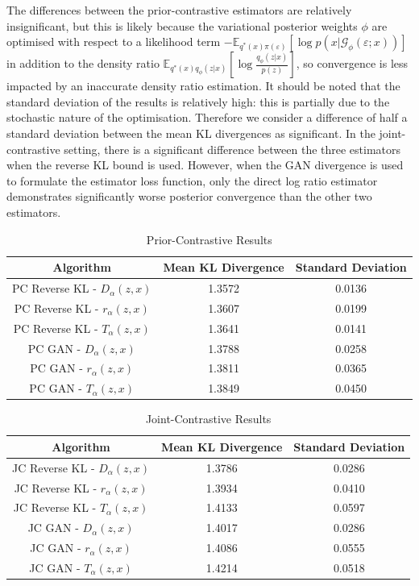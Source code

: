 \documentclass[honours,12pt]{unswthesis}
\newcommand{\E}{\mathbb{E}}
\numberwithin{equation}{section}
\theoremstyle{definition}
\begin{document}
The differences between the prior-contrastive estimators are relatively insignificant, but this is likely because the variational posterior weights $\phi$ are optimised with respect to a likelihood term $-\E_{q^*(x)\pi(\varepsilon)}[\log p(x|\mathcal{G}_\phi(\varepsilon;x))]$ in addition to the density ratio $\E_{q^*(x)q_\phi(z|x)}\left[\log \frac{q_\phi(z|x)}{p(z)}\right]$, so convergence is less impacted by an inaccurate density ratio estimation. It should be noted that the standard deviation of the results is relatively high: this is partially due to the stochastic nature of the optimisation. Therefore we consider a difference of half a standard deviation between the mean KL divergences as significant. In the joint-contrastive setting, there is a significant difference between the three estimators when the reverse KL bound is used. However, when the GAN divergence is used to formulate the estimator loss function, only the direct log ratio estimator demonstrates significantly worse posterior convergence than the other two estimators.
\begin{table}[h]
\centering
\begin{tabular}{|c|c|c|}
\hline
Algorithm & Mean KL Divergence & Standard Deviation\\
\hline
PC Reverse KL - $D_\alpha(z,x)$ & 1.3572 & 0.0136\\
\hline
PC Reverse KL - $r_\alpha(z,x)$ & 1.3607 & 0.0199\\
\hline
PC Reverse KL - $T_\alpha(z,x)$ & 1.3641 & 0.0141\\
\hline
PC GAN - $D_\alpha(z,x)$ & 1.3788 & 0.0258\\
\hline
PC GAN - $r_\alpha(z,x)$ & 1.3811 & 0.0365\\
\hline
PC GAN - $T_\alpha(z,x)$ & 1.3849 & 0.0450\\
\hline
\end{tabular}
\caption{Prior-Contrastive Results}
\label{tab:7.1}
\end{table}
\begin{table}[h]
\centering
\begin{tabular}{|c|c|c|}
\hline
Algorithm & Mean KL Divergence & Standard Deviation\\
\hline
JC Reverse KL - $D_\alpha(z,x)$ & 1.3786 & 0.0286\\
\hline
JC Reverse KL - $r_\alpha(z,x)$ & 1.3934 & 0.0410\\
\hline
JC Reverse KL - $T_\alpha(z,x)$ & 1.4133 & 0.0597\\
\hline
JC GAN - $D_\alpha(z,x)$ & 1.4017 & 0.0286\\
\hline
JC GAN - $r_\alpha(z,x)$ & 1.4086 & 0.0555\\
\hline
JC GAN - $T_\alpha(z,x)$ & 1.4214 & 0.0518\\
\hline
\end{tabular}
\caption{Joint-Contrastive Results}
\end{table}
\end{document}
